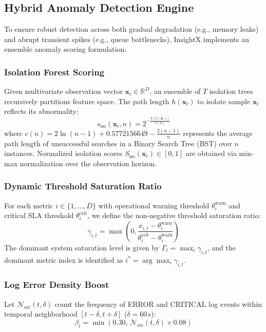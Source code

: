 \documentclass[conference]{IEEEtran}
\begin{document}
\subsection{Hybrid Anomaly Detection Engine}
To ensure robust detection across both gradual degradation (e.g., memory leaks) and abrupt transient spikes (e.g., queue bottlenecks), InsightX implements an ensemble anomaly scoring formulation:

\subsubsection{Isolation Forest Scoring}
Given multivariate observation vector $\mathbf{x}_t \in \mathbb{R}^D$, an ensemble of $T$ isolation trees recursively partitions feature space. The path length $h(\mathbf{x}_t)$ to isolate sample $\mathbf{x}_t$ reflects its abnormality:
\begin{equation}
s_{\text{iso}}(\mathbf{x}_t, n) = 2^{-\frac{\mathbb{E}[h(\mathbf{x}_t)]}{c(n)}}
\end{equation}
where $c(n) = 2 \ln(n - 1) + 0.5772156649 - \frac{2(n - 1)}{n}$ represents the average path length of unsuccessful searches in a Binary Search Tree (BST) over $n$ instances. Normalized isolation scores $S_{\text{iso}}(\mathbf{x}_t) \in [0, 1]$ are obtained via min-max normalization over the observation horizon.

\subsubsection{Dynamic Threshold Saturation Ratio}
For each metric $i \in \{1, \dots, D\}$ with operational warning threshold $\theta_{i}^{\text{warn}}$ and critical SLA threshold $\theta_{i}^{\text{crit}}$, we define the non-negative threshold saturation ratio:
\begin{equation}
\gamma_{i, t} = \max\left(0, \frac{x_{i, t} - \theta_{i}^{\text{warn}}}{\theta_{i}^{\text{crit}} - \theta_{i}^{\text{warn}}}\right)
\end{equation}
The dominant system saturation level is given by $\Gamma_t = \max_{i} \gamma_{i, t}$, and the dominant metric index is identified as $i^* = \arg\max_{i} \gamma_{i, t}$.

\subsubsection{Log Error Density Boost}
Let $\mathcal{N}_{\text{err}}(t, \delta)$ count the frequency of ERROR and CRITICAL log events within temporal neighborhood $[t - \delta, t + \delta]$ ($\delta = 60\,\text{s}$):
\begin{equation}
\beta_t = \min\left(0.30, \, \mathcal{N}_{\text{err}}(t, \delta) \times 0.08\right)
\end{equation}
\end{document}

